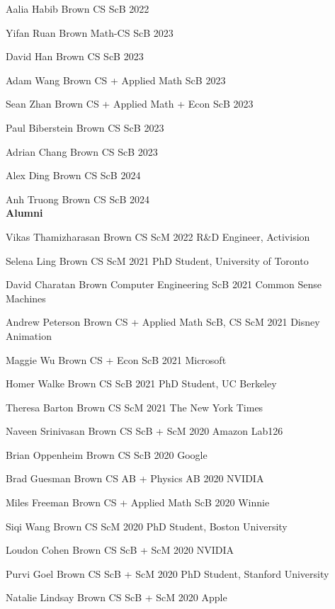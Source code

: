 \documentclass[line,margin]{res}
\begin{document}
\begin{resume}
\student
{Aalia Habib}
{Brown CS ScB}
{2022}

\student
{Yifan Ruan}
{Brown Math-CS ScB}
{2023}

\student
{David Han}
{Brown CS ScB}
{2023}

\student
{Adam Wang}
{Brown CS + Applied Math ScB}
{2023}

\student
{Sean Zhan}
{Brown CS + Applied Math + Econ ScB}
{2023}

\student
{Paul Biberstein}
{Brown CS ScB}
{2023}

\student
{Adrian Chang}
{Brown CS ScB}
{2023}

\student
{Alex Ding}
{Brown CS ScB}
{2024}

\student
{Anh Truong}
{Brown CS ScB}
{2024}
\\


\textbf{Alumni}

\alumni
{Vikas Thamizharasan}
{Brown CS ScM}
{2022}
{R\&D Engineer, Activision}

\alumni
{Selena Ling}
{Brown CS ScM}
{2021}
{PhD Student, University of Toronto}

\alumni
{David Charatan}
{Brown Computer Engineering ScB}
{2021}
{Common Sense Machines}

\alumni
{Andrew Peterson}
{Brown CS + Applied Math ScB, CS ScM}
{2021}
{Disney Animation}

\alumni
{Maggie Wu}
{Brown CS + Econ ScB}
{2021}
{Microsoft}

\alumni
{Homer Walke}
{Brown CS ScB}
{2021}
{PhD Student, UC Berkeley}

\alumni
{Theresa Barton}
{Brown CS ScM}
{2021}
{The New York Times}

\alumni
{Naveen Srinivasan}
{Brown CS ScB + ScM}
{2020}
{Amazon Lab126}

\alumni
{Brian Oppenheim}
{Brown CS ScB}
{2020}
{Google}

\alumni
{Brad Guesman}
{Brown CS AB + Physics AB}
{2020}
{NVIDIA}

\alumni
{Miles Freeman}
{Brown CS + Applied Math ScB}
{2020}
{Winnie}

\alumni
{Siqi Wang}
{Brown CS ScM}
{2020}
{PhD Student, Boston University}

\alumni
{Loudon Cohen}
{Brown CS ScB + ScM}
{2020}
{NVIDIA}

\alumni
{Purvi Goel}
{Brown CS ScB + ScM}
{2020}
{PhD Student, Stanford University}

\alumni
{Natalie Lindsay}
{Brown CS ScB + ScM}
{2020}
{Apple}


\end{resume}
\end{document}
